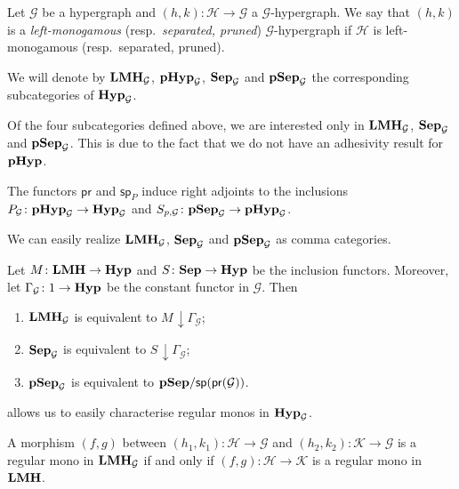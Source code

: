\documentclass[3p]{elsarticle}
\newcommand{\catname}[1]{\textbf{\textup{#1}}}
\newcommand{\lmo}{\catname{LMH}}
\newcommand{\hyp}{\catname{Hyp}}
\newcommand{\phyp}{\catname{pHyp}}
\newcommand{\pshyp}{\catname{pSep}}
\newcommand{\shyp}{\catname{Sep}}
\renewcommand{\sp}{\mathsf{sp}}
\newcommand{\pr}{\mathsf{pr}}
\renewcommand{\comma}[2]{#1\hspace{1pt} {\downarrow}#2}
\theoremstyle{remark}
\theoremstyle{definition}
\begin{document}
\begin{defi}
	Let $\mathcal{G}$ be a hypergraph and $(h,k)\colon \mathcal{H}\to \mathcal{G}$  a $\mathcal{G}$-hypergraph. We say that $(h,k)$ is a \emph{left-monogamous} (resp.~\emph{separated, pruned}) $\mathcal{G}$-hypergraph if $\mathcal{H}$ is left-monogamous (resp.~separated, pruned).
	
	We will denote by $\lmo_{\mathcal{G}}$, $\phyp_{\mathcal{G}}$, $\shyp_{\mathcal{G}}$ and $\pshyp_{\mathcal{G}}$ the corresponding subcategories of $\hyp_{\mathcal{G}}$.
\end{defi}

\begin{rem}Of the four subcategories  defined above, we are interested only in  $\lmo_{\mathcal{G}}$, $\shyp_{\mathcal{G}}$ and $\pshyp_{\mathcal{G}}$. This is due to the fact that we do not have an adhesivity result for $\phyp$.
\end{rem}

\begin{rem} The functors $\pr$ and $\sp_P$ induce right adjoints to the inclusions $P_\mathcal{G}\colon \phyp_\mathcal{G} \to \hyp_{\mathcal{G}}$ and $S_{p, \mathcal{G}}\colon \pshyp_\mathcal{G}\to \phyp_{\mathcal{G}}$.
\end{rem}
We can easily realize $\lmo_{\mathcal{G}}$, $\shyp_{\mathcal{G}}$ and $\pshyp_{\mathcal{G}}$ as comma categories.

\begin{prop}
Let $M\colon \lmo \to \hyp$ and $S\colon \shyp \to \hyp$ be the inclusion functors. Moreover, let $\Gamma_{\mathcal{G}}\colon 1\to \hyp$ be the constant functor in $\mathcal{G}$. Then
\begin{enumerate}
	\item $\lmo_{\mathcal{G}}$ is equivalent to $\comma{M}{\Gamma_\mathcal{G}}$;
	\item $\shyp_{\mathcal{G}}$ is equivalent to $\comma{S}{\Gamma_\mathcal{G}}$; 
	\item $\pshyp_{\mathcal{G}}$ is equivalent to $\pshyp/\sp(\pr(\mathcal{G}))$. 
\end{enumerate}
\end{prop}

 allows us to easily characterise regular monos in $\hyp_{\mathcal{G}}$.
\begin{prop}
	A morphism $(f,g)$ between $(h_1, k_1)\colon \mathcal{H}\to \mathcal{G}$ and  $(h_2, k_2)\colon \mathcal{K}\to \mathcal{G}$ is a regular mono in $\lmo_{\mathcal{G}}$ if and only if $(f,g)\colon \mathcal{H}\to \mathcal{K}$ is a regular mono in $\lmo$.
\end{prop}
\end{document}

